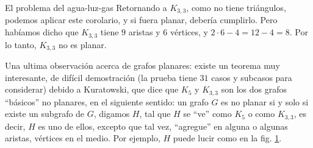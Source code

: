 \begin{section}{El problema del agua-luz-gas}
Retornando a $K_{3,3}$, como no tiene triángulos, podemos aplicar este corolario, y si fuera planar, debería cumplirlo. Pero habíamos dicho que $K_{3,3}$ tiene $9$ aristas y $6$ vértices, y $2\cdot 6-4=12-4=8$. Por lo tanto, $K_{3,3}$ no es planar.

Una ultima observación acerca de grafos planares: existe un teorema muy interesante, de difícil demostración (la prueba tiene $31$ casos y subcasos para considerar) debido a Kuratowski, que    dice que $K_5$ y $K_{3,3}$ son los dos grafos ``básicos'' no planares, en el siguiente sentido: un grafo $G$ es no planar si y solo si existe un subgrafo de $G$, digamos $H$, tal que $H$ se ``ve'' como $K_5$ o como $K_{3,3}$, es decir, $H$ es uno de ellos, excepto que tal vez, ``agregue'' en alguna o algunas
aristas, vértices en el medio. Por ejemplo, $H$ puede lucir como en la fig. \ref{fA4.10}.

\begin{figure}[ht]
    \begin{center}
    \end{center}
    \caption{}\label{fA4.10}
\end{figure}

\end{section}


